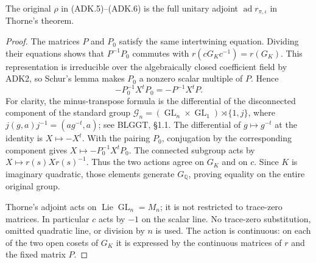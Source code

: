 \begin{lemma}
\label{claim:ADK4}
The original $\rho$ in (ADK.5)--(ADK.6) is the full unitary adjoint
$\operatorname{ad}r_{\pi,\iota}$ in Thorne's theorem.
\end{lemma}
\begin{proof}
The matrices $P$ and $P_0$ satisfy the same intertwining equation.
Dividing their equations shows that $P^{-1}P_0$ commutes with
$r(cG_Kc^{-1})=r(G_K)$.  This representation is irreducible over
the algebraically closed coefficient field by ADK2, so Schur's lemma
makes $P_0$ a nonzero scalar multiple of $P$.  Hence
\[
              -P_0^{-1}X^tP_0=-P^{-1}X^tP.
 \tag{ADK.8}
\]
For clarity, the minus-transpose formula is the differential of the
disconnected component of the standard group
$\mathcal G_n=(\operatorname{GL}_n\times\operatorname{GL}_1)
\rtimes\{1,j\}$, where
$j(g,a)j^{-1}=(a g^{-t},a)$; see BLGGT, \S1.1.
The differential of $g\mapsto g^{-t}$ at the identity is
$X\mapsto-X^t$.  With the pairing $P_0$, conjugation by the
corresponding component gives $X\mapsto-P_0^{-1}X^tP_0$.
The connected subgroup acts by $X\mapsto r(s)Xr(s)^{-1}$.
Thus the two actions agree on $G_K$ and on $c$.  Since $K$ is
imaginary quadratic, those elements generate $G_{\mathbb Q}$,
proving equality on the entire original group.

Thorne's adjoint acts on $\operatorname{Lie}\operatorname{GL}_n=M_n$;
it is not restricted to trace-zero matrices.  In particular $c$
acts by $-1$ on the scalar line.  No trace-zero substitution, omitted
quadratic line, or division by $n$ is used.  The action is continuous:
on each of the two open cosets of $G_K$ it is expressed by the
continuous matrices of $r$ and the fixed matrix $P$.
\end{proof}

